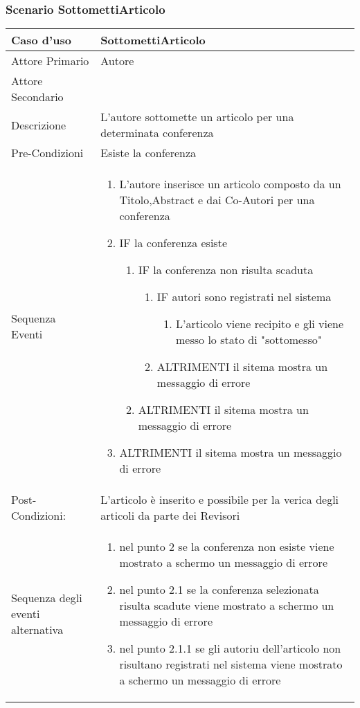 \subsubsection{Scenario SottomettiArticolo}
\begin{tabular}{|p{3cm}|p{7cm}|}
\hline 
\rowcolor{Orchid}
Caso d'uso & SottomettiArticolo \\
\hline
  Attore Primario & Autore\\
  \hline
  Attore Secondario & \\
\hline
Descrizione & L'autore sottomette un articolo per una determinata conferenza\\
\hline
Pre-Condizioni& Esiste la conferenza\\
\hline
  Sequenza Eventi &
                    \begin{enumerate}
                      \item L'autore inserisce un articolo composto da un Titolo,Abstract e dai Co-Autori per una conferenza
                      \item IF la conferenza esiste
                      \begin{enumerate}
                          \item IF la conferenza non risulta scaduta
                          \begin{enumerate}
                            \item IF autori sono registrati nel sistema 
                            \begin{enumerate}
                              \item L'articolo viene recipito e gli viene messo lo stato di "sottomesso"
                            \end{enumerate}
                            \item ALTRIMENTI il sitema mostra un messaggio di errore
                          \end{enumerate}
                        \item ALTRIMENTI il sitema mostra un messaggio di errore
                      \end{enumerate}
                      \item ALTRIMENTI il sitema mostra un messaggio di errore
                    \end{enumerate} \\
\hline
Post-Condizioni: &L'articolo è inserito e possibile per la verica degli articoli da parte dei Revisori\\
\hline
Sequenza degli eventi alternativa & \begin{enumerate}
  \item nel punto 2 se la conferenza non esiste viene mostrato a schermo un messaggio di errore
  \item nel punto 2.1 se la conferenza selezionata risulta scadute viene mostrato a schermo un messaggio di errore
  \item nel punto 2.1.1 se gli autoriu dell'articolo non risultano registrati nel sistema viene mostrato a schermo un messaggio di errore
\end{enumerate}\\
\hline
\end{tabular}

